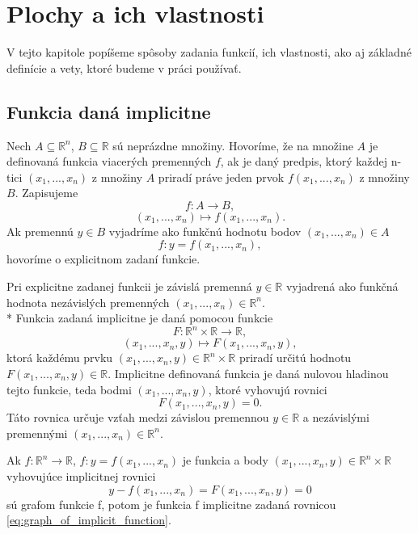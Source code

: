 \chapter{Plochy a ich vlastnosti}

\label{kap:plochy} %

V tejto kapitole popíšeme spôsoby zadania funkcií, ich vlastnosti, 
ako aj základné definície a vety, ktoré budeme v práci používať.

\section{Funkcia daná implicitne}

\begin{definition}
    Nech $A \subseteq \mathbb{R}^n$, $B \subseteq \mathbb{R}$ sú neprázdne množiny. 
Hovoríme, že na množine $A$ je definovaná funkcia viacerých premenných
$f$, ak je daný predpis, ktorý každej n-tici $(x_1, . . . , x_n)$
z množiny $A$ priradí práve jeden prvok $f(x_1, . . . , x_n)$ z množiny $B$.
Zapisujeme 
$$f : A \to B,$$
$$(x_1, . . . , x_n) \mapsto f(x_1, . . . , x_n).$$
Ak premennú $y \in B$ vyjadríme ako funkčnú hodnotu bodov $(x_1, . . . , x_n) \in A$
$$f : y = f(x_1, . . . , x_n),$$
hovoríme o explicitnom zadaní funkcie.
\end{definition}


Pri explicitne zadanej funkcii je závislá premenná $y \in \mathbb{R}$ vyjadrená ako funkčná hodnota nezávislých
premenných $(x_1, . . . , x_n)\in\mathbb{R}^n$.
\\*
Funkcia zadaná implicitne je daná pomocou funkcie $$F : \mathbb{R}^n \times \mathbb{R} \to \mathbb{R},$$
$$(x_1, . . . ,x_n, y) \mapsto F(x_1, . . . , x_n, y),$$ ktorá každému prvku $(x_1, . . . ,x_n, y) \in \mathbb{R}^{n} \times \mathbb{R}$ 
priradí určitú hodnotu \mbox{$F(x_1, . . . , x_n, y) \in \mathbb{R}$.}
Implicitne definovaná funkcia je daná nulovou hladinou tejto funkcie, teda bodmi $(x_1, . . . , x_n, y)$, 
ktoré vyhovujú rovnici $$F(x_1, . . . , x_n, y) = 0.$$  
Táto rovnica určuje vzťah medzi závislou premennou $y \in \mathbb{R}$
a nezávislými premennými $(x_1, . . . , x_n) \in \mathbb{R}^n$. 

\begin{note}
    Ak $f : \mathbb{R}^n \to \mathbb{R}$, $f: y = f(x_1, . . . , x_n)$ je funkcia a body
    $(x_1, . . . , x_n, y) \in \mathbb{R}^n \times \mathbb{R}$ vyhovujúce implicitnej rovnici
        \begin{equation}
        \label{eq:graph_of_implicit_function}
        y - f(x_1, ..., x_n) = F(x_1, . . . , x_n, y) = 0
        \end{equation}
    sú grafom funkcie f,
    potom je funkcia f implicitne zadaná rovnicou \ref{eq:graph_of_implicit_function}.
\end{note}

